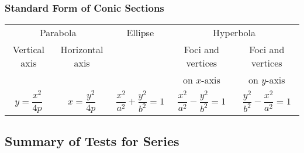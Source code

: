 \subsubsection*{Standard Form of Conic Sections}

{\addtolength{\tabcolsep}{6pt}
\begin{tabular}{ c c c c c }
\multicolumn{2}{c}{Parabola} & \hspace{5em}Ellipse\hspace{5em} & \multicolumn{2}{c}{Hyperbola} \\
Vertical axis & Horizontal axis & & Foci and vertices & Foci and vertices \\
& & & on $x$-axis & on $y$-axis \\
$y=\dfrac{x^2}{4p}$ & $x=\dfrac{y^2}{4p}$ & $\dfrac{x^2}{a^2}+\dfrac{y^2}{b^2}=1$ & $\dfrac{x^2}{a^2}-\dfrac{y^2}{b^2}=1$ & $\dfrac{y^2}{b^2}-\dfrac{x^2}{a^2}=1$
\end{tabular}}

\clearpage

\subsection{Summary of Tests for Series}\label{tab_series_tests}

